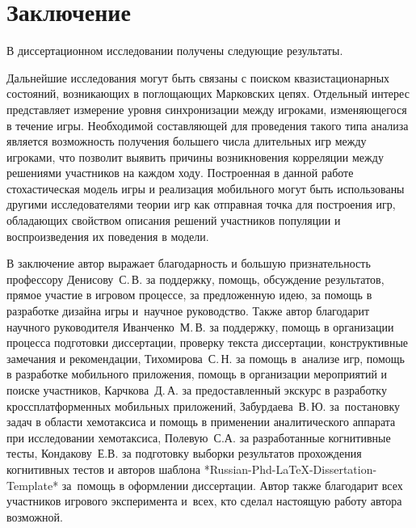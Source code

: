 \chapter*{Заключение}                       %


В диссертационном исследовании получены следующие результаты.


Дальнейшие исследования могут быть связаны с поиском квазистационарных состояний, возникающих в поглощающих Марковских цепях. Отдельный интерес представляет измерение уровня синхронизации между игроками, изменяющегося в течение игры. Необходимой составляющей для проведения такого типа анализа является возможность получения большего числа длительных игр между игроками, что позволит выявить причины возникновения корреляции между решениями участников на каждом ходу. Построенная в данной работе стохастическая модель игры и реализация мобильного могут быть использованы другими исследователями теории игр как отправная точка для построения игр, обладающих свойством описания решений участников популяции и воспроизведения их поведения в модели. 

В заключение автор выражает благодарность и большую признательность профессору Денисову~С.\,В. за поддержку, помощь, обсуждение результатов, прямое участие в игровом процессе, за предложенную идею, за помощь в разработке дизайна игры и~научное руководство. Также автор благодарит научного руководителя Иванченко~М.\,В. за поддержку, помощь в организации процесса подготовки диссертации, проверку текста диссертации, конструктивные замечания и рекомендации, Тихомирова~С.\,Н. за помощь в~анализе игр, помощь в разработке мобильного приложения, помощь в организации мероприятий и поиске участников, Карчкова~Д.\,А. за предоставленный экскурс в разработку кроссплатформенных мобильных приложений, Забурдаева~В.\,Ю. за~постановку задач в области хемотаксиса и помощь в применении аналитического аппарата при исследовании хемотаксиса, Полевую~С.А. за разработанные когнитивные тесты, Кондакову~Е.В. за подготовку выборки результатов прохождения когнитивных тестов и авторов шаблона *Russian-Phd-LaTeX-Dissertation-Template* за~помощь в оформлении диссертации. Автор также благодарит всех участников игрового эксперимента и~всех, кто сделал настоящую работу автора возможной.
